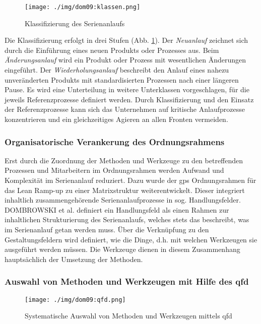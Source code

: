 \begin{figure}[ht]
 \centering
 \texttt{[image: ./img/dom09:klassen.png]}
 \caption[Klassifizierung des Serienanlaufs]{Klassifizierung des Serienanlaufs \autocite{Dombrowski2009}}
 \label{fig:anlaufklassen}
\end{figure}

Die Klassifizierung erfolgt in drei Stufen (Abb. \ref{fig:anlaufklassen}). 
Der \textit{Neuanlauf} zeichnet sich durch die Einführung eines neuen Produkts oder Prozesses aus. 
Beim \textit{Änderungsanlauf} wird ein Produkt oder Prozess mit wesentlichen Änderungen eingeführt. Der \textit{Wiederholungsanlauf} beschreibt den Anlauf eines nahezu unveränderten Produkts mit standardisierten Prozessen nach einer längeren Pause. 
Es wird eine Unterteilung in weitere Unterklassen vorgeschlagen, für die jeweils Referenzprozesse definiert werden. 
Durch Klassifizierung und den Einsatz der Referenzprozesse kann sich das Unternehmen auf kritische Anlaufprozesse konzentrieren und ein gleichzeitiges Agieren an allen Fronten vermeiden.

\subsubsection{Organisatorische Verankerung des Ordnungsrahmens}
Erst durch die Zuordnung der Methoden und Werkzeuge zu den betreffenden Prozessen und Mitarbeitern im Ordnungsrahmen werden Aufwand und Komplexität im Serienanlauf reduziert. Dazu wurde der \gls{gps} Ordnungsrahmen für das Lean Ramp-up zu einer Matrixstruktur weiterentwickelt. Dieser integriert inhaltlich zusammengehörende Serienanlaufprozesse in sog. Handlungsfelder. DOMBROWSKI et al. definiert ein Handlungsfeld als einen Rahmen zur inhaltlichen Strukturierung des Serienanlaufs, welches stets das beschreibt, was im Serienanlauf getan werden muss. Über die Verknüpfung zu den Gestaltungsfeldern wird definiert, wie die Dinge, d.h. mit welchen Werkzeugen sie ausgeführt werden müssen. Die Werkzeuge dienen in diesem Zusammenhang hauptsächlich der Umsetzung der Methoden. 

\subsubsection{Auswahl von Methoden und Werkzeugen mit Hilfe des \gls{qfd}}

\begin{figure}[ht]
 \centering
 \texttt{[image: ./img/dom09:qfd.png]}
 \caption[Systematische Auswahl von Methoden und Werkzeugen mittels \gls{qfd}]{Systematische Auswahl von Methoden und Werkzeugen mittels \gls{qfd} \autocite{Dombrowski2009}}
 \label{fig:qfd}
\end{figure}

